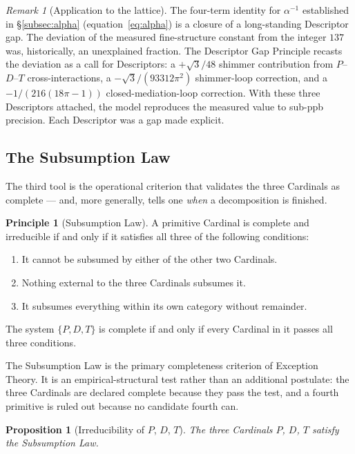 \documentclass[11pt,a4paper]{article}
\newtheorem{proposition}[theorem]{Proposition}
\theoremstyle{definition}
\newtheorem{principle}[theorem]{Principle}
\theoremstyle{remark}
\newtheorem{remark}[theorem]{Remark}
\begin{document}
\begin{remark}[Application to the lattice]
The four-term identity for $\alpha^{-1}$ established in \S\ref{subsec:alpha} (equation~\eqref{eq:alpha}) is a closure of a long-standing Descriptor gap. The deviation of the measured fine-structure constant from the integer $137$ was, historically, an unexplained fraction. The Descriptor Gap Principle recasts the deviation as a call for Descriptors: a $+\sqrt{3}/48$ shimmer contribution from $P$--$D$--$T$ cross-interactions, a $-\sqrt{3}/(93312\pi^{2})$ shimmer-loop correction, and a $-1/(216(18\pi-1))$ closed-mediation-loop correction. With these three Descriptors attached, the model reproduces the measured value to sub-ppb precision. Each Descriptor was a gap made explicit.
\end{remark}

\subsection{The Subsumption Law}\label{subsec:subsumption}

The third tool is the operational criterion that validates the three Cardinals as complete --- and, more generally, tells one \emph{when} a decomposition is finished.

\begin{principle}[Subsumption Law]\label{princ:subsumption}
A primitive Cardinal is complete and irreducible if and only if it satisfies all three of the following conditions:
\begin{enumerate}[label=(\roman*),leftmargin=*]
\item It cannot be subsumed by either of the other two Cardinals.
\item Nothing external to the three Cardinals subsumes it.
\item It subsumes everything within its own category without remainder.
\end{enumerate}
The system $\{P,D,T\}$ is complete if and only if every Cardinal in it passes all three conditions.
\end{principle}

The Subsumption Law is the primary completeness criterion of Exception Theory. It is an empirical-structural test rather than an additional postulate: the three Cardinals are declared complete because they pass the test, and a fourth primitive is ruled out because no candidate fourth can.

\begin{proposition}[Irreducibility of $P$, $D$, $T$]\label{prop:irreducibility}
The three Cardinals $P$, $D$, $T$ satisfy the Subsumption Law.
\end{proposition}
\end{document}
